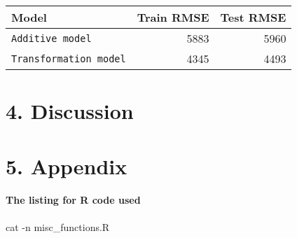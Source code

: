 \documentclass[]{article}
\newenvironment{Shaded}{\begin{snugshade}}{\end{snugshade}}
\newcommand{\FunctionTok}[1]{\textcolor[rgb]{0.00,0.00,0.00}{#1}}
\newcommand{\NormalTok}[1]{#1}
\let\oldparagraph\paragraph
\renewcommand{\paragraph}[1]{\oldparagraph{#1}\mbox{}}
\begin{document}
\begin{longtable}[]{@{}lrr@{}}
\toprule
Model & Train RMSE & Test RMSE\tabularnewline
\midrule
\endhead
\texttt{Additive\ model} & 5883 & 5960\tabularnewline
\texttt{Transformation\ model} & 4345 & 4493\tabularnewline
\bottomrule
\end{longtable}

\hypertarget{discussion}{%
\section{4. Discussion}\label{discussion}}

\hypertarget{appendix}{%
\section{5. Appendix}\label{appendix}}

\hypertarget{the-listing-for-r-code-used}{%
\paragraph{The listing for R code
used}\label{the-listing-for-r-code-used}}

\begin{Shaded}
\begin{Highlighting}[]
\FunctionTok{cat}\NormalTok{ -n misc_functions.R}
\end{Highlighting}
\end{Shaded}
\end{document}
